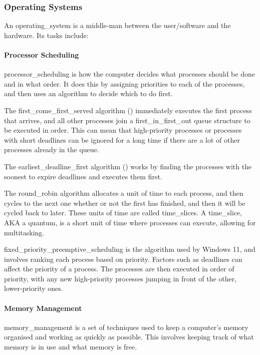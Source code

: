         \subsubsection{Operating Systems}
            An \gls{operating_system} is a middle-man between the user/\gls{software} and the \gls{hardware}.
            Its tasks include:

            \paragraph{Processor Scheduling}
            \gls{processor_scheduling} is how the computer decides what processes should be done and in what order.
            It does this by assigning priorities to each of the processes, and then uses an \gls{algorithm} to decide which to do first.

            The \gls{first_come_first_served} \gls{algorithm} (\acroFIFO) immediately executes the first process that arrives, and all other processes join a \gls{first_in_first_out} \gls{queue} structure to be executed in order.
            This can mean that high-priority processes or processes with short deadlines can be ignored for a long time if there are a lot of other processes already in the \gls{queue}.

            The \gls{earliest_deadline_first} \gls{algorithm} (\acroEDF) works by finding the processes with the soonest to expire deadlines and executes them first.

            The \gls{round_robin} \gls{algorithm} allocates a unit of time to each process, and then cycles to the next one whether or not the first has finished, and then it will be cycled back to later.
            These units of time are called \glspl{time_slice}.
            A \gls{time_slice}, AKA a quantum, is a short unit of time where processes can execute, allowing for multitasking.

            \Gls{fixed_priority_preemptive_scheduling} is the \gls{algorithm} used by Windows 11, and involves ranking each process based on priority.
            Factors such as deadlines can affect the priority of a process.
            The processes are then executed in order of priority, with any new high-priority processes jumping in front of the other, lower-priority ones.

            \paragraph{Memory Management}
            \Gls{memory_management} is a set of techniques used to keep a computer's \gls{memory} organised and working as quickly as possible.
            This involves keeping track of what \gls{memory} is in use and what \gls{memory} is free.

